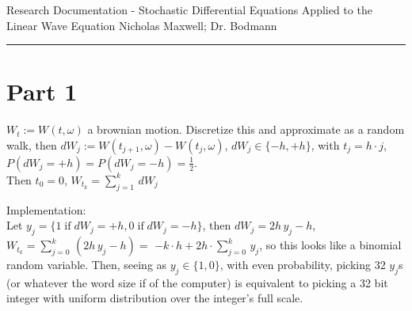 \documentclass[12pt]{article}
\newcommand{\IF}[0] { \; \textrm{if} \; }
\begin{document}
\begin{flushleft}
Research Documentation - Stochastic Differential Equations Applied to the Linear Wave Equation
Nicholas Maxwell; Dr. Bodmann\\
\end{flushleft}

\begin{flushleft}
\addvspace{5pt} \hrule
\end{flushleft}	



\section*{Part 1}

\begin{flushleft}
$W_t := W(t,\omega)$ a brownian motion. Discretize this and approximate as a random walk, then $dW_j := W(t_{j+1},\omega)-W(t_{j},\omega)$, $dW_j \in \{-h, +h\}$, with $t_j = h \cdot j$, $P(dW_j = +h) = P(dW_j = -h) = \frac{1}{2}$. \\
Then $t_0 = 0$, $W_{t_k} = \sum_{j=1}^{k} \, dW_j$
\end{flushleft}

\begin{flushleft}
Implementation:\\
Let $y_j = \{ 1 \IF dW_j = +h, 0 \IF dW_j = -h \}$, then $dW_j = 2h\, y_j-h$, $W_{t_k} = \sum_{j=0}^{k} \, (2h\, y_j-h) =$ $ -k \cdot h + 2h \cdot \sum_{j=0}^{k} \, y_j$, so this looks like a binomial random variable. Then, seeing as $y_j \in \{ 1,0\}$, with even probability, picking 32 $y_j$s (or whatever the word size if of the computer) is equivalent to picking a 32 bit integer with uniform distribution over the integer's full scale. 
\end{flushleft}
\end{document}
